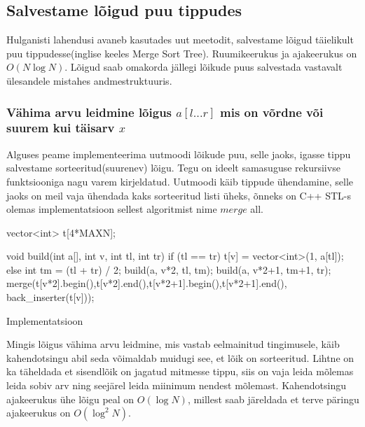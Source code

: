\documentclass{trkut}
\theoremstyle{definition}
\begin{document}
\subsection{Salvestame lõigud puu tippudes}

Hulganisti lahendusi avaneb kasutades uut meetodit, salvestame lõigud täielikult puu tippudesse(inglise keeles Merge Sort Tree). Ruumikeerukus ja ajakeerukus on $O(N\log N)$. Lõigud saab omakorda jällegi lõikude puus salvestada vastavalt ülesandele mistahes andmestruktuuris. \parencite{EMaxx}

\subsubsection{Vähima arvu leidmine lõigus $a[l...r]$ mis on võrdne või suurem kui täisarv $x$}
Alguses peame implementeerima uutmoodi lõikude puu, selle jaoks, igasse tippu salvestame sorteeritud(suurenev) lõigu. Tegu on ideelt samasuguse rekursiivse funktsiooniga nagu varem kirjeldatud. 
Uutmoodi käib tippude ühendamine, selle jaoks on meil vaja ühendada kaks sorteeritud listi üheks, õnneks on C++ STL-s olemas implementatsioon sellest algoritmist nime $merge$ all. \parencite{EMaxx}

\begin{cclol}
vector<int> t[4*MAXN];

void build(int a[], int v, int tl, int tr) {
if (tl == tr) {
    t[v] = vector<int>(1, a[tl]);
} else { 
    int tm = (tl + tr) / 2;
    build(a, v*2, tl, tm);
    build(a, v*2+1, tm+1, tr);
    merge(t[v*2].begin(),t[v*2].end(),t[v*2+1].begin(),t[v*2+1].end(),
             back_inserter(t[v]));
}
}
\end{cclol}
 \begin{kk}[H]%
    \caption{Implementatsioon}%
    \label{EMaxx}%
    \end{kk}
Mingis lõigus vähima arvu leidmine, mis vastab eelmainitud tingimusele, käib kahendotsingu abil seda võimaldab muidugi see, et lõik on sorteeritud.
Lihtne on ka täheldada et sisendlõik on jagatud mitmesse tippu, siis on vaja leida mõlemas leida sobiv arv ning seejärel leida miinimum nendest mõlemast.
Kahendotsingu ajakeerukus ühe lõigu peal on $O(\log N)$, millest saab järeldada et terve päringu ajakeerukus on $O(\log^2 N)$. \parencite{EMaxx}
\end{document}
